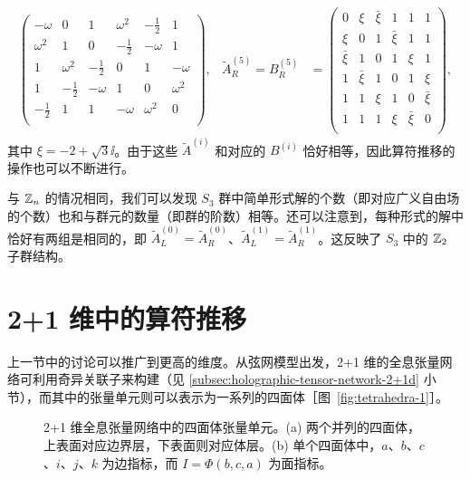 \begin{align}
\begin{pmatrix}
    -\omega & 0 & 1 & \omega^2 & -\frac12 & 1 \\
    \omega^2 & 1 & 0 & -\frac12 & -\omega & 1 \\
    1 & \omega^2 & -\frac12 & 0 & 1 & -\omega \\
    1 & -\frac12 & -\omega & 1 & 0 & \omega^2 \\
    -\frac12 & 1 & 1 & -\omega & \omega^2 & 0 \\
  \end{pmatrix}, &
  \tilde{A}^{(5)}_R = B^{(5)}_R &= \begin{pmatrix}
    0 & \xi & \bar{\xi} & 1 & 1 & 1 \\
    \xi & 0 & 1 & \bar{\xi} & 1 & 1 \\
    \bar{\xi} & 1 & 0 & 1 & \xi & 1 \\
    1 & \bar{\xi} & 1 & 0 & 1 & \xi \\
    1 & 1 & \xi & 1 & 0 & \bar{\xi} \\
    1 & 1 & 1 & \xi & \bar{\xi} & 0 \\
  \end{pmatrix},
\end{align}
其中 $\xi=-2+\sqrt3\ii$。由于这些 $\tilde{A}^{(i)}$ 和对应的 $B^{(i)}$ 恰好相等，因此算符推移的操作也可以不断进行。
\endgroup

与 $\mathbb{Z}_n$ 的情况相同，我们可以发现 $S_3$ 群中简单形式解的个数（即对应广义自由场的个数）也和与群元的数量（即群的阶数）相等。还可以注意到，每种形式的解中恰好有两组是相同的，即 $\tilde{A}^{(0)}_L=\tilde{A}^{(0)}_R$、$\tilde{A}^{(1)}_L=\tilde{A}^{(1)}_R$。这反映了 $S_3$ 中的 $\mathbb{Z}_2$ 子群结构。

\section{2+1 维中的算符推移}

上一节中的讨论可以推广到更高的维度。从弦网模型出发，2+1 维的全息张量网络可利用奇异关联子来构建（见 \ref{subsec:holographic-tensor-network-2+1d} 小节），而其中的张量单元则可以表示为一系列的四面体［图~\ref{fig:tetrahedra-1}］。

\begin{figure}[htb]
  \centering
   \qquad
  \caption[2+1 维全息张量网络中的四面体张量单元]{2+1 维全息张量网络中的四面体张量单元。(a) 两个并列的四面体，上表面对应边界层，下表面则对应体层。(b) 单个四面体中，$a$、$b$、$c$、$i$、$j$、$k$ 为边指标，而 $I=\Phi(b,c,a)$ 为面指标。}
\end{figure}

